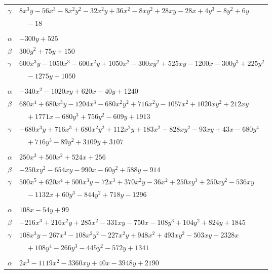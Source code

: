 \documentclass[11pt]{article}
\begin{document}
\begin{longtable}{@{}ll@{}}
$\gamma$ & $8x^{3}y-56x^{3}-8x^{2}y^{2}-32x^{2}y+36x^{2}-8xy^{2}+28xy-28x+4y^{3}-8y^{2}+6y$\\
 & $\quad -18$\\
\addlinespace[3pt]
\multicolumn{2}{@{}l}{$\{i,j\}=\{32,55\}$, $k_{ij}=3^{3}\cdot 5^{2}$}\\
$\alpha$ & $-300y+525$\\
$\beta$ & $300y^{2}+75y+150$\\
$\gamma$ & $600x^{3}y-1050x^{3}-600x^{2}y+1050x^{2}-300xy^{2}+525xy-1200x-300y^{3}+225y^{2}$\\
 & $\quad -1275y+1050$\\
\addlinespace[3pt]
\multicolumn{2}{@{}l}{$\{i,j\}=\{32,58\}$, $k_{ij}=2^{2}\cdot 3^{3}\cdot 5\cdot 7$}\\
$\alpha$ & $-340x^{2}-1020xy+620x-40y+1240$\\
$\beta$ & $680x^{4}+680x^{3}y-1204x^{3}-680x^{2}y^{2}+716x^{2}y-1057x^{2}+1020xy^{2}+212xy$\\
 & $\quad +1771x-680y^{3}+756y^{2}-609y+1913$\\
$\gamma$ & $-680x^{3}y+716x^{3}+680x^{2}y^{2}+112x^{2}y+183x^{2}-828xy^{2}-93xy+43x-680y^{4}$\\
 & $\quad +716y^{3}-89y^{2}+3109y+3107$\\
\addlinespace[3pt]
\multicolumn{2}{@{}l}{$\{i,j\}=\{32,62\}$, $k_{ij}=2\cdot 3^{2}\cdot 7$}\\
$\alpha$ & $250x^{3}+560x^{2}+524x+256$\\
$\beta$ & $-250xy^{2}-654xy-990x-60y^{2}+588y-914$\\
$\gamma$ & $500x^{5}+620x^{4}+500x^{3}y-72x^{3}+370x^{2}y-36x^{2}+250xy^{3}+250xy^{2}-536xy$\\
 & $\quad -1132x+60y^{3}-844y^{2}+718y-1296$\\
\addlinespace[3pt]
\multicolumn{2}{@{}l}{$\{i,j\}=\{32,66\}$, $k_{ij}=3^{2}\cdot 7^{3}$}\\
$\alpha$ & $108x-54y+99$\\
$\beta$ & $-216x^{3}+216x^{2}y+285x^{2}-331xy-750x-108y^{3}+104y^{2}+824y+1845$\\
$\gamma$ & $108x^{3}y-267x^{3}-108x^{2}y^{2}-227x^{2}y+948x^{2}+493xy^{2}-503xy-2328x$\\
 & $\quad +108y^{4}-266y^{3}-445y^{2}-572y+1341$\\
\addlinespace[3pt]
\multicolumn{2}{@{}l}{$\{i,j\}=\{32,77\}$, $k_{ij}=3^{3}\cdot 7^{2}$}\\
$\alpha$ & $2x^{3}-1119x^{2}-3360xy+40x-3948y+2190$\\

\end{longtable}
\end{document}
